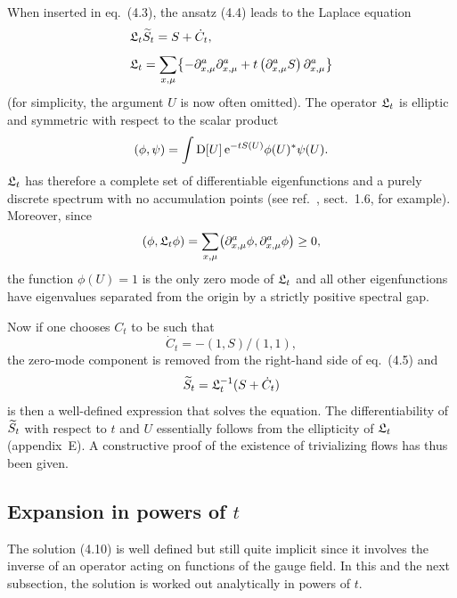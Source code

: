 When inserted in eq.~(4.3), the ansatz (4.4) leads to the
Laplace equation
\begin{align}
  &\mathfrak{L}_t\widetilde{S}_t=S+\dot{C}_t,
  \\[1.0ex]
  &\mathfrak{L}_t=
  \sum_{x,\mu}\bigl\{
  -\partial^a_{x,\mu}\partial^a_{x,\mu}
  +t\left(\partial^a_{x,\mu}S\right)\partial^a_{x,\mu}\bigr\}
\end{align}
(for simplicity, the argument $U$ is now often omitted).
The operator $\mathfrak{L}_t$ is elliptic and symmetric with respect to
the scalar product
\begin{equation}
   (\phi,\psi)=\int\mathrm{D}[U]\,\mathrm{e}^{-tS(U)}\phi(U)^*\psi(U).
\end{equation}
$\mathfrak{L}_t$ has therefore a complete set of differentiable
eigenfunctions and a purely discrete spectrum
with no accumulation points (see ref.~\cite{Gilkey}, sect.~1.6,
for example).
Moreover, since
\begin{equation}
   (\phi,\mathfrak{L}_t\phi)=\sum_{x,\mu}\bigl(\partial^a_{x,\mu}\phi,\partial^a_{x,\mu}\phi
   \bigr)\geq0,
\end{equation}
the function $\phi(U)=1$ is the only zero mode of $\mathfrak{L}_t$
and all other eigenfunctions have eigenvalues separated
from the origin by a strictly positive spectral gap.

Now if one chooses $C_t$ to be such that
\begin{equation}
   \dot{C}_t=-(1,S)/(1,1),
\end{equation}
the zero-mode component is removed from
the right-hand side of eq.~(4.5) and
\begin{equation}
   \widetilde{S}_t=\mathfrak{L}_t^{-1}(S+\dot{C}_t)
\end{equation}
is then a well-defined expression that solves the equation.
The differentiability of $\widetilde{S}_t$ with respect to $t$ and $U$
essentially follows from the ellipticity of $\mathfrak{L}_t$
(appendix~E).
A constructive proof of the existence of
trivializing flows has thus been given.


\subsection{Expansion in powers of $t$}

The solution (4.10) is well defined but still quite
implicit since it involves the inverse of an operator
acting on functions of the gauge field. In this and
the next subsection,
the solution is worked out analytically
in powers of $t$.

